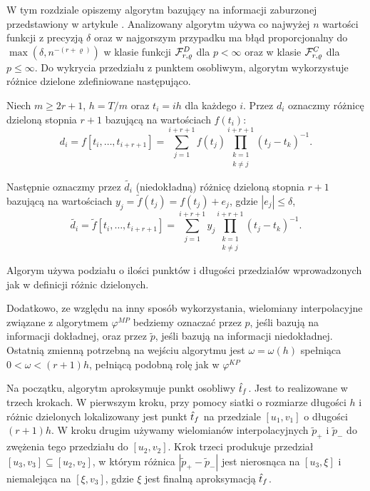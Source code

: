 \documentclass[oik, pdftex, man]{mgrwms}
\begin{document}
    W tym rozdziale opiszemy algorytm bazujący na informacji zaburzonej przedstawiony w artykule \cite{AoP}. Analizowany algorytm używa co najwyżej $n$ wartości funkcji z precyzją $\delta $ oraz w najgorszym przypadku ma błąd proporcjonalny do $\max{(\delta, n^{-(r + \varrho) })}$ w klasie funkcji $\mathcal{F}^D_{r,\varrho }$ dla $p < \infty$ oraz w klasie $\mathcal{F}^C_{r,\varrho }$ dla $p \leq \infty$. Do wykrycia przedziału z punktem osobliwym, algorytm wykorzystuje różnice dzielone zdefiniowane następująco.
    
    Niech $m \geq 2r + 1$, $h = T/ m$ oraz $t_{i} = ih$ dla każdego $i$. Przez $d_{i}$ oznaczmy różnicę dzieloną stopnia $r+1$ bazującą na wartościach $f(t_{i})$:
    \begin{equation} \label{eq:30:roznica_dzielna}
        d_{i} = f[t_{i}, \dots, t_{i+r+1}] = \sum_{j = 1}^{i+r+1} f(t_{j}) \prod_{\substack{k=1 \\ k \neq j}}^{i+r+1}(t_{j}-t_{k})^{-1}.
    \end{equation}

    Następnie oznaczmy przez $\tilde{d_i}$ (niedokładną) różnicę dzieloną stopnia $r+1$ bazującą na wartościach $y_{j} = \tilde{f}(t_{j}) = f(t_{j}) + e_{j}$, gdzie $|e_{j}| \leq \delta$,
    \begin{equation} \label{eq:31:niedokladna_roznica_dzielna}
        \tilde{d_{i}} = \tilde{f}[t_{i}, \dots, t_{i+r+1}] = \sum_{j = 1}^{i+r+1} y_{j} \prod_{\substack{k=1 \\ k \neq j}}^{i+r+1}(t_{j}-t_{k})^{-1}.
    \end{equation}

    Algorym używa podziału o ilości punktów i długości przedziałów wprowadzonych jak w definicji różnic dzielonych. 
    
    Dodatkowo, ze względu na inny sposób wykorzystania, wielomiany interpolacyjne związane z algorytmem $\varphi^{MP}$ bedziemy oznaczać przez $p$, jeśli bazują na informacji dokładnej, oraz przez $\tilde{p}$, jeśli bazują na informacji niedokładnej. Ostatnią zmienną potrzebną na wejściu algorytmu jest $\omega  = \omega(h)$ spełniąca $0 < \omega < (r + 1)h $, pełniącą podobną rolę jak w $\varphi^{KP}$
    
    Na początku, algorytm aproksymuje punkt osobliwy $\hat{t}_f$. Jest to realizowane w trzech krokach. W pierwszym kroku, przy pomocy siatki o rozmiarze długości $h$ i różnic dzielonych lokalizowany jest punkt $\hat{t}_f$ na przedziale $[u_1, v_1]$ o długości $(r + 1)h$. W kroku drugim używamy wielomianów interpolacyjnych $\tilde{p}_+$ i $\tilde{p}_-$ do zwężenia tego przedziału do $[u_2, v_2]$. Krok trzeci produkuje przedział $[u_3, v_3] \subseteq [u_2, v_2]$, w którym różnica $|\tilde{p}_{+} - \tilde{p}_{-}|$ jest nierosnąca na $[u_3, \xi]$ i niemalejąca na $[\xi, v_3]$, gdzie $\xi$ jest finalną aproksymacją $\hat{t}_f$.
\end{document}
